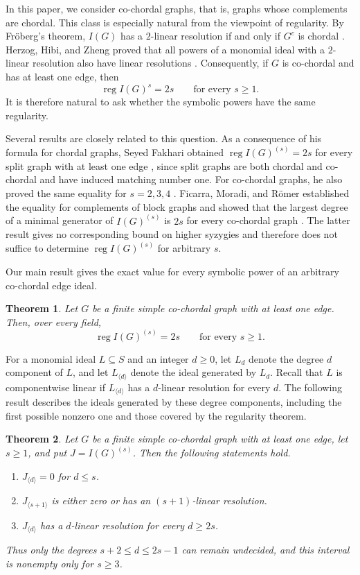 \documentclass[11pt]{amsart}
\newtheorem{theorem}{Theorem}[section]
\theoremstyle{definition}
\newcommand{\reg}{\operatorname{reg}}
\begin{document}
In this paper, we consider co-chordal graphs, that is, graphs whose complements are chordal. This class is especially natural from the viewpoint of regularity. By Fr\"oberg's theorem, $I(G)$ has a $2$-linear resolution if and only if $G^c$ is chordal \cite{Froberg}. Herzog, Hibi, and Zheng proved that all powers of a monomial ideal with a $2$-linear resolution also have linear resolutions \cite{HHZ}. Consequently, if $G$ is co-chordal and has at least one edge, then
\[
\reg I(G)^s=2s
\qquad\text{for every }s\ge1.
\]
It is therefore natural to ask whether the symbolic powers have the same regularity.

Several results are closely related to this question. As a consequence of his formula for chordal graphs, Seyed Fakhari obtained $\reg I(G)^{(s)}=2s$ for every split graph with at least one edge \cite[Theorem~3.3]{FakhariChordal}, since split graphs are both chordal and co-chordal and have induced matching number one. For co-chordal graphs, he also proved the same equality for $s=2,3,4$ \cite{FakhariSmall}. Ficarra, Moradi, and R\"omer established the equality for complements of block graphs and showed that the largest degree of a minimal generator of $I(G)^{(s)}$ is $2s$ for every co-chordal graph \cite{FMR}. The latter result gives no corresponding bound on higher syzygies and therefore does not suffice to determine $\reg I(G)^{(s)}$ for arbitrary $s$.

Our main result gives the exact value for every symbolic power of an arbitrary co-chordal edge ideal.

\begin{theorem}\label{thm:1}
Let $G$ be a finite simple co-chordal graph with at least one edge. Then, over every field,
\[
\reg I(G)^{(s)}=2s
\qquad\text{for every }s\ge1.
\]
\end{theorem}

For a monomial ideal $L\subseteq S$ and an integer $d\ge0$, let $L_d$ denote the degree $d$ component of $L$, and let $L_{\langle d\rangle}$ denote the ideal generated by $L_d$. Recall that $L$ is componentwise linear if $L_{\langle d\rangle}$ has a $d$-linear resolution for every $d$. The following result describes the ideals generated by these degree components, including the first possible nonzero one and those covered by the regularity theorem.

\begin{theorem}\label{thm:1.2}
Let $G$ be a finite simple co-chordal graph with at least one edge, let $s\ge1$, and put $J=I(G)^{(s)}$. Then the following statements hold.
\begin{enumerate}[label=\textup{(\roman*)}]
\item $J_{\langle d\rangle}=0$ for $d\le s$.
\item $J_{\langle s+1\rangle}$ is either zero or has an $(s+1)$-linear resolution.
\item $J_{\langle d\rangle}$ has a $d$-linear resolution for every $d\ge2s$.
\end{enumerate}
Thus only the degrees $s+2\le d\le2s-1$ can remain undecided, and this interval is nonempty only for $s\ge3$.
\end{theorem}
\end{document}
